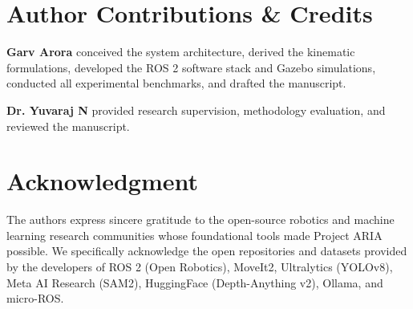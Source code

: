 \documentclass[journal]{IEEEtran}
\begin{document}
\section*{Author Contributions \& Credits}
\textbf{Garv Arora} conceived the system architecture, derived the kinematic formulations, developed the ROS 2 software stack and Gazebo simulations, conducted all experimental benchmarks, and drafted the manuscript.

\textbf{Dr. Yuvaraj N} provided research supervision, methodology evaluation, and reviewed the manuscript.

\section*{Acknowledgment}
The authors express sincere gratitude to the open-source robotics and machine learning research communities whose foundational tools made Project ARIA possible. We specifically acknowledge the open repositories and datasets provided by the developers of ROS 2 (Open Robotics), MoveIt2, Ultralytics (YOLOv8), Meta AI Research (SAM2), HuggingFace (Depth-Anything v2), Ollama, and micro-ROS.

\def\IEEEbibitemsep{-1.2pt}


\end{document}
